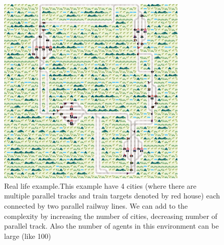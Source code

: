 \begin{figure}[h]
    \centering
    \includegraphics[width=0.8\textwidth]{flatland5}
    \caption{ Real life example.This example have 4 cities (where there are multiple parallel tracks and train targets 
    denoted by red house) each connected by two parallel railway lines. We can add to the complexity by increasing the
    number of cities, decreasing number of parallel track. Also the number of agents in this environment can be large 
    (like 100)\cite{WEBSITE:6} }
    \label{image-myimage2}
\end{figure}
